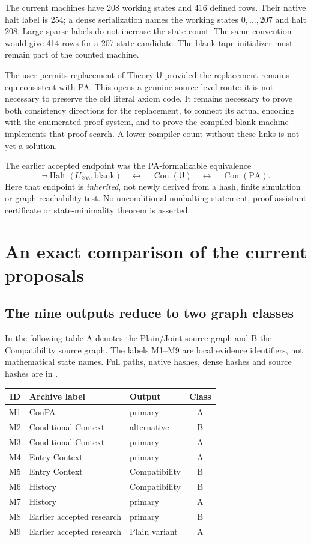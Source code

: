 \documentclass[11pt,letterpaper]{article}
\newcommand{\PA}{\mathrm{PA}}\newcommand{\UU}{\mathsf U}
\newcommand{\Con}{\operatorname{Con}}\newcommand{\Halt}{\operatorname{Halt}}
\begin{document}
The current machines have 208 working states and 416 defined rows. Their
native halt label is 254; a dense serialization names the working states
$0,\ldots,207$ and halt 208. Large sparse labels do not increase the state
count. The same convention would give 414 rows for a 207-state candidate.
The blank-tape initializer must remain part of the counted machine.

The user permits replacement of Theory $\UU$ provided the replacement remains
equiconsistent with PA. This opens a genuine source-level route: it is not
necessary to preserve the old literal axiom code. It remains necessary to
prove both consistency directions for the replacement, to connect its actual
encoding with the enumerated proof system, and to prove the compiled blank
machine implements that proof search. A lower compiler count without these
links is not yet a solution.

The earlier accepted endpoint was the PA-formalizable equivalence
\[
 \neg\Halt(U_{208},\mathrm{blank})
 \quad\longleftrightarrow\quad \Con(\UU)
 \quad\longleftrightarrow\quad \Con(\PA).
\]
Here that endpoint is \emph{inherited}, not newly derived from a hash, finite
simulation or graph-reachability test. No unconditional nonhalting statement,
proof-assistant certificate or state-minimality theorem is asserted.

\section{An exact comparison of the current proposals}
\subsection{The nine outputs reduce to two graph classes}
In the following table A denotes the Plain/Joint source graph and B the
Compatibility source graph. The labels M1--M9 are local evidence identifiers,
not mathematical state names. Full paths, native hashes, dense hashes and
source hashes are in .

\begin{center}\small
\begin{tabular}{cllc}\toprule
ID & Archive label & Output & Class\\\midrule
M1 & ConPA & primary & A\\
M2 & Conditional Context & alternative & B\\
M3 & Conditional Context & primary & A\\
M4 & Entry Context & primary & A\\
M5 & Entry Context & Compatibility & B\\
M6 & History & Compatibility & B\\
M7 & History & primary & A\\
M8 & Earlier accepted research & primary & B\\
M9 & Earlier accepted research & Plain variant & A\\\bottomrule
\end{tabular}
\end{center}
\end{document}
